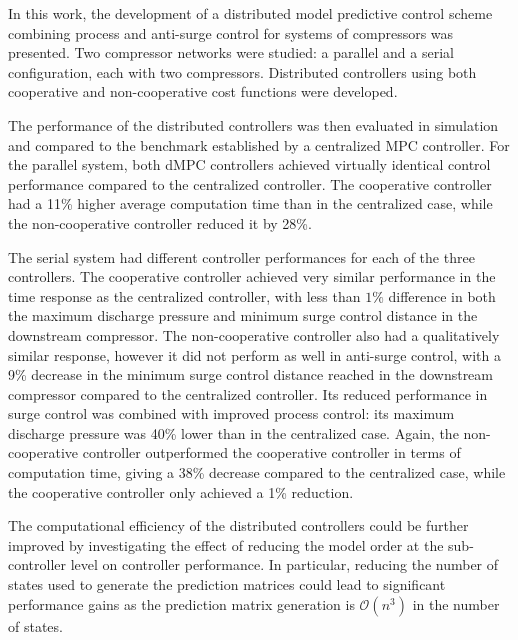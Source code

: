 \label{sec:conclusion}

In this work, the development of a distributed model predictive control scheme combining process and anti-surge control for systems of compressors was presented.
Two compressor networks were studied: a parallel and a serial configuration, each with two compressors.
Distributed controllers using both cooperative and non-cooperative cost functions were developed.

The performance of the distributed controllers was then evaluated in simulation and compared to the benchmark established by a centralized MPC controller.
For the parallel system, both dMPC controllers achieved virtually identical control performance compared to the centralized controller.
The cooperative controller had a 11\% higher average computation time than in the centralized case, while the non-cooperative controller reduced it by 28\%.

The serial system had different controller performances for each of the three controllers.
The cooperative controller achieved very similar performance in the time response as the centralized controller, with less than $1\%$ difference in both the maximum discharge pressure and minimum surge control distance in the downstream compressor.
The non-cooperative controller also had a qualitatively similar response, however it did not perform as well in anti-surge control, with a 9\% decrease in the minimum surge control distance reached in the downstream compressor compared to the centralized controller.
Its reduced performance in surge control was combined with improved process control: its maximum discharge pressure was 40\% lower than in the centralized case.
Again, the non-cooperative controller outperformed the cooperative controller in terms of computation time, giving a 38\% decrease compared to the centralized case, while the cooperative controller only achieved a 1\% reduction.  

The computational efficiency of the distributed controllers could be further improved by investigating the effect of reducing the model order at the sub-controller level on controller performance.
In particular, reducing the number of states used to generate the prediction matrices could lead to significant performance gains as the prediction matrix generation is $\mathcal{O}(n^3)$ in the number of states.
